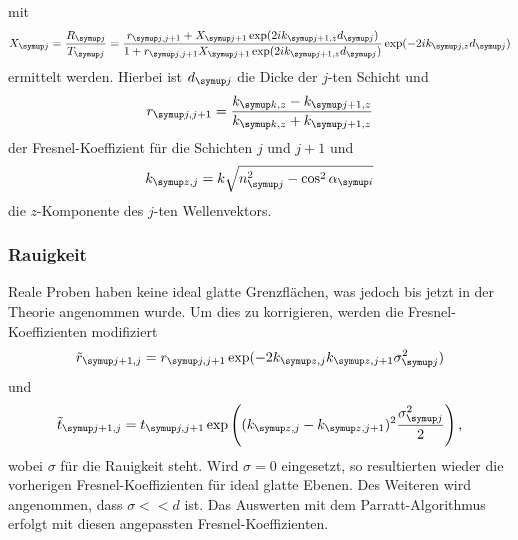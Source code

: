 mit 
\begin{equation}
  X\idx{j} = \frac{R\idx{j}}{T\idx{j}} = \frac{r\idx{j,j+1} + X\idx{j+1} \exp({2ik\idx{j+1,z}d\idx{j}})}{1+ r\idx{j,j+1} X\idx{j+1} \exp({2ik\idx{j+1,z}d\idx{j}})} \exp({-2ik\idx{j,z}d\idx{j}})
\end{equation}
ermittelt werden. Hierbei ist $d\idx{j}$ die Dicke der $j$-ten Schicht und 
\begin{equation}
  r\idx{j,j+1} = \frac{k\idx{k,z} - k\idx{j+1,z}}{k\idx{k,z} + k\idx{j+1,z}}
\end{equation}
der Fresnel-Koeffizient für die Schichten $j$ und $j+1$ und 
\begin{equation}
  k\idx{z,j} = k \sqrt{n^2\idx{j}-\cos^2\alpha\idx{i}}
\end{equation}
die $z$-Komponente des $j$-ten Wellenvektors.


\subsubsection{Rauigkeit}
Reale Proben haben keine ideal glatte Grenzflächen, was jedoch bis jetzt in der Theorie angenommen wurde. 
Um dies zu korrigieren, werden die Fresnel-Koeffizienten modifiziert
\begin{equation}
  \tilde{r}\idx{j+1,j} = r\idx{j,j+1} \exp(-2k\idx{z,j}k\idx{z,j+1} \sigma^2\idx{j})
\end{equation}
und
\begin{equation}
  \tilde{t}\idx{j+1,j} = t\idx{j,j+1} \exp \left ((k\idx{z,j}-k\idx{z,j+1})^2 \frac{\sigma^2\idx{j}}{2} \right ),
\end{equation}
wobei $\sigma$ für die Rauigkeit steht. Wird $\sigma=0$ eingesetzt, so resultierten wieder die vorherigen Fresnel-Koeffizienten
für ideal glatte Ebenen. Des Weiteren wird angenommen, dass $\sigma << d$ ist.
Das Auswerten mit dem Parratt-Algorithmus erfolgt mit diesen angepassten Fresnel-Koeffizienten.







